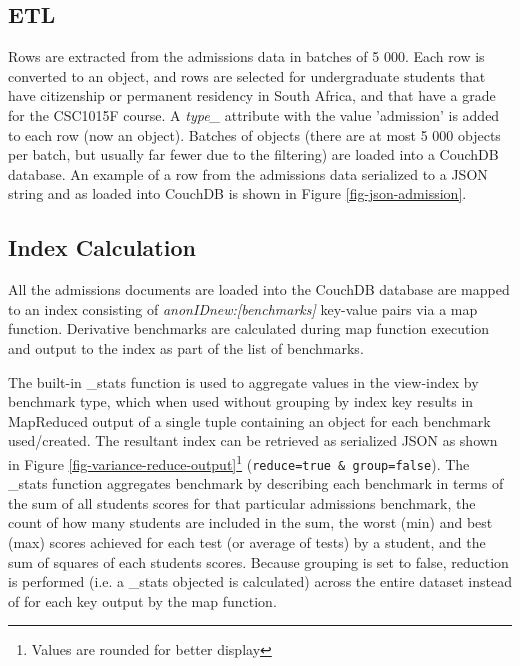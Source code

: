 \subsection{ETL}
Rows are extracted from the admissions data in batches of 5 000. Each row is converted to an object, and rows are selected for undergraduate students that have citizenship or permanent residency in South Africa, and that have a grade for the CSC1015F course. A \textit{type\_} attribute with the value 'admission' is added to each row (now an object). Batches of objects (there are at most 5 000 objects per batch, but usually far fewer due to the filtering) are loaded into a CouchDB database. An example of a row from the admissions data serialized to a JSON string and as loaded into CouchDB is shown in Figure \ref{fig-json-admission}.



\subsection{Index Calculation}
All the admissions documents are loaded into the CouchDB database are mapped to an index consisting of \textit{anonIDnew:[benchmarks]} key-value pairs via a map function. Derivative benchmarks are calculated during map function execution and output to the index as part of the list of benchmarks.

The built-in \_stats function is used to aggregate values in the view-index by benchmark type, which when used without grouping by index key results in MapReduced output of a single tuple containing an object for each benchmark used/created. The resultant index can be retrieved as serialized JSON as shown in Figure \ref{fig-variance-reduce-output}\footnote{Values are rounded for better display} (\texttt{reduce=true \& group=false}). The \_stats function aggregates benchmark by describing each benchmark in terms of the sum of all students scores for that particular admissions benchmark, the count of how many students are included in the sum, the worst (min) and best (max) scores achieved for each test (or average of tests) by a student, and the sum of squares of each students scores. Because grouping is set to false, reduction is performed (i.e. a \_stats objected is calculated) across the entire dataset instead of for each key output by the map function.



